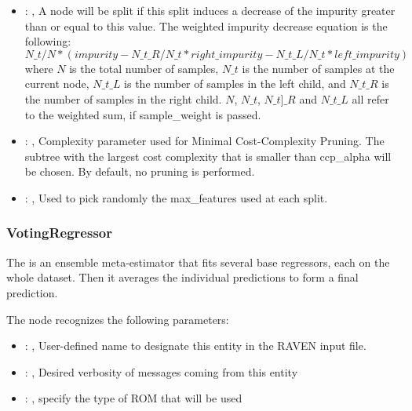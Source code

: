 \begin{itemize}
    \item {}: , 
      A node will be split if this split induces a decrease of the impurity greater than or equal to
      this value.                                                  The weighted impurity decrease
      equation is the following:                                                  $N\_t / N *
      (impurity - N\_t\_R / N\_t * right\_impurity - N\_t\_L / N\_t * left\_impurity)$
      where $N$ is the total number of samples, $N\_t$ is the number of samples at the current node,
      $N\_t\_L$ is the number                                                  of samples in the
      left child, and $N\_t\_R$ is the number of samples in the right child.
      $N$, $N\_t$, $N\_t]\_R$ and $N\_t\_L$ all refer to the weighted sum, if sample\_weight is
      passed.

    \item {}: , 
      Complexity parameter used for Minimal Cost-Complexity Pruning. The subtree with the largest
      cost                                                  complexity that is smaller than
      ccp\_alpha will be chosen. By default, no pruning is performed.

    \item {}: , 
      Used to pick randomly the max\_features used at each split.
  \end{itemize}


\subsubsection{VotingRegressor}
  The  is an ensemble meta-estimator that fits several base
  regressors, each on the whole dataset. Then it averages the individual predictions to form
  a final prediction.

  The  node recognizes the following parameters:
    \begin{itemize}
      \item {}: , 
        User-defined name to designate this entity in the RAVEN input file.
      \item {}: , 
        Desired verbosity of messages coming from this entity
      \item {}: , 
        specify the type of ROM that will be used
  \end{itemize}

